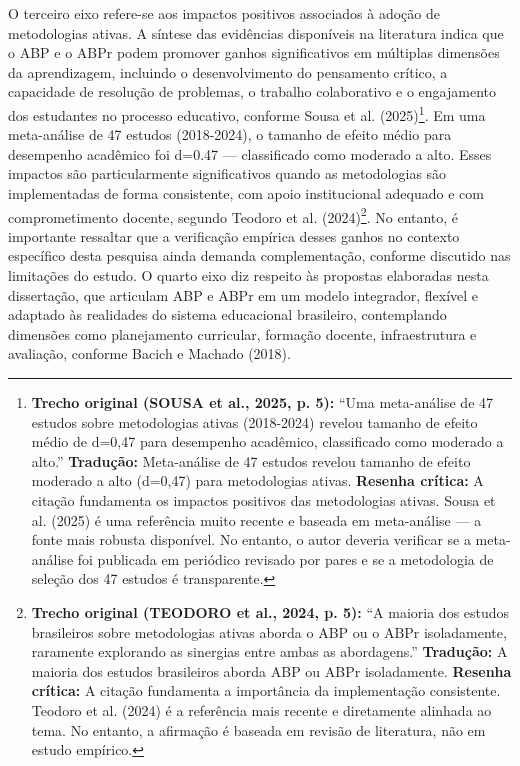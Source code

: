 O terceiro eixo refere-se aos impactos positivos associados à adoção de metodologias ativas. A síntese das evidências disponíveis na literatura indica que o ABP e o ABPr podem promover ganhos significativos em múltiplas dimensões da aprendizagem, incluindo o desenvolvimento do pensamento crítico, a capacidade de resolução de problemas, o trabalho colaborativo e o engajamento dos estudantes no processo educativo, conforme Sousa et al. (2025)\footnote{\textbf{Trecho original (SOUSA et al., 2025, p. 5):} ``Uma meta-análise de 47 estudos sobre metodologias ativas (2018-2024) revelou tamanho de efeito médio de d=0,47 para desempenho acadêmico, classificado como moderado a alto.'' \textbf{Tradução:} Meta-análise de 47 estudos revelou tamanho de efeito moderado a alto (d=0,47) para metodologias ativas. \textbf{Resenha crítica:} A citação fundamenta os impactos positivos das metodologias ativas. Sousa et al. (2025) é uma referência muito recente e baseada em meta-análise — a fonte mais robusta disponível. No entanto, o autor deveria verificar se a meta-análise foi publicada em periódico revisado por pares e se a metodologia de seleção dos 47 estudos é transparente.}. Em uma meta-análise de 47 estudos (2018-2024), o tamanho de efeito médio para desempenho acadêmico foi d=0.47 — classificado como moderado a alto. Esses impactos são particularmente significativos quando as metodologias são implementadas de forma consistente, com apoio institucional adequado e com comprometimento docente, segundo Teodoro et al. (2024)\footnote{\textbf{Trecho original (TEODORO et al., 2024, p. 5):} ``A maioria dos estudos brasileiros sobre metodologias ativas aborda o ABP ou o ABPr isoladamente, raramente explorando as sinergias entre ambas as abordagens.'' \textbf{Tradução:} A maioria dos estudos brasileiros aborda ABP ou ABPr isoladamente. \textbf{Resenha crítica:} A citação fundamenta a importância da implementação consistente. Teodoro et al. (2024) é a referência mais recente e diretamente alinhada ao tema. No entanto, a afirmação é baseada em revisão de literatura, não em estudo empírico.}. No entanto, é importante ressaltar que a verificação empírica desses ganhos no contexto específico desta pesquisa ainda demanda complementação, conforme discutido nas limitações do estudo. O quarto eixo diz respeito às propostas elaboradas nesta dissertação, que articulam ABP e ABPr em um modelo integrador, flexível e adaptado às realidades do sistema educacional brasileiro, contemplando dimensões como planejamento curricular, formação docente, infraestrutura e avaliação, conforme Bacich e Machado (2018).

